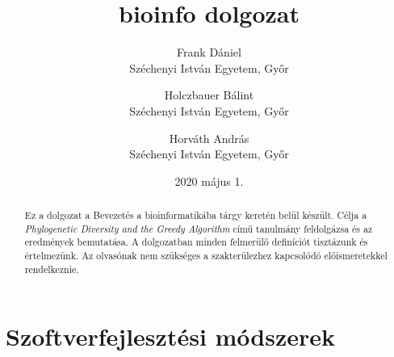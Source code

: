 \documentclass[a4paper,12pt,leqno, notitlepage]{article}%
\begin{document}
\title{bioinfo dolgozat}
\author{Frank Dániel \\ Széchenyi István Egyetem, Győr
				\and
				Holczbauer Bálint \\ Széchenyi István Egyetem, Győr
				\and
				Horváth András \\ Széchenyi István Egyetem, Győr}
\date{2020 május 1.}
\maketitle

\begin{abstract}

Ez a dolgozat a Bevezetés a bioinformatikába tárgy keretén belül készült.
Célja a \emph{Phylogenetic Diversity and the Greedy Algorithm}\cite{ptrrees_and_greedy} című tanulmány feldolgázsa és az eredmények bemutatása.
A dolgozatban minden felmerülő definíciót tisztázunk és értelmezünk. Az olvasónak nem szükséges a szakterülezhez kapcsolódó előismeretekkel rendelkeznie.

\end{abstract}

\section{Szoftver\-fejlesztési módszerek}
\label{sec:s}

{}


\end{document}
